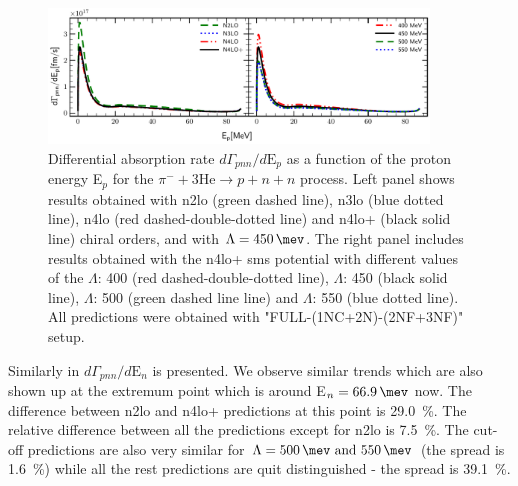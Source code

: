     \begin{figure}[h]
        \begin{center}
        \includegraphics[width=0.9\textwidth]{PlotData/PION/Dalitz_maps/figures/3HE_dGdEp.pdf}
        \end{center}
        \caption{Differential absorption rate $d\Gamma_{pnn} /d\text{E}_p$ 
        as a function of the proton energy E$_p$ for the 
        $\pi^- + 3\text{He} \rightarrow p + n + n$ process.
        Left panel shows results obtained with \gls{n2lo} (green dashed line),
        \gls{n3lo} (blue dotted line), \gls{n4lo} (red dashed-double-dotted line)
        and \gls{n4lo+} (black solid line) chiral orders, and with $\Lambda = \SI{450}{\mev}$.
        The right panel includes results obtained with the \gls{n4lo+} \gls{sms} potential
        with different values of the $\Lambda$: \SI{400}{\mev} (red dashed-double-dotted line),
        $\Lambda$: \SI{450}{\mev} (black solid line),
        $\Lambda$: \SI{500}{\mev} (green dashed line line) and
        $\Lambda$: \SI{550}{\mev} (blue dotted line).
        All predictions were obtained with "FULL-(1NC+2N)-(2NF+3NF)" setup.}
        \label{pion_GdEp}
    \end{figure}

    Similarly in  $d\Gamma_{pnn} /d\text{E}_n$ is presented. We observe similar trends
    which are also shown up at the extremum point which is around E$_n = \SI{66.9}{\mev}$ now.
    The difference between \gls{n2lo} and \gls{n4lo+} predictions at this point is \SI{29.0}{\percent}.
    The relative difference between all the predictions except for \gls{n2lo}
    is \SI{7.5}{\percent}.
    The cut-off predictions are also very similar for $\Lambda=\SIlist{500;550}{\mev}$ (the spread is \SI{1.6}{\percent})
    while all the rest predictions are quit distinguished - the spread is \SI{39.1}{\percent}.


